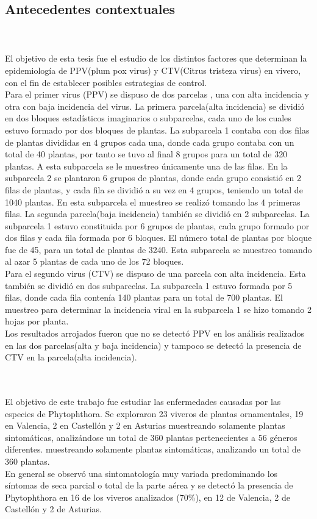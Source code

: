 \subsection{Antecedentes contextuales}
~\\\textbf{\citet{AC1}}
~\\El objetivo de esta tesis fue el estudio de los distintos factores que determinan la epidemiolog\'{i}a de PPV(plum pox virus) y CTV(Citrus tristeza virus) en vivero, con el fin de establecer posibles estrategias de control. 
~\\Para el primer virus (PPV) se dispuso de dos parcelas , una con alta incidencia y otra con baja incidencia del virus. La primera parcela(alta incidencia) se dividi\'{o} en dos bloques estad\'{i}sticos imaginarios o subparcelas, cada uno de los cuales estuvo formado por dos bloques de plantas. La subparcela 1 contaba con dos filas de plantas divididas en 4 grupos cada una, donde cada grupo contaba con un total de 40 plantas, por tanto se tuvo al final 8 grupos para un total de 320 plantas. A esta subparcela se le muestreo \'{u}nicamente una de las filas. En la subparcela 2 se plantaron 6 grupos de plantas, donde cada grupo consisti\'{o} en 2 filas de plantas, y cada fila se dividi\'{o} a su vez en 4 grupos, teniendo un total de 1040 plantas. En esta subparcela el muestreo se realiz\'{o} tomando las 4 primeras filas. La segunda parcela(baja incidencia) tambi\'{e}n se dividi\'{o} en 2 subparcelas. La subparcela 1 estuvo constituida por 6 grupos de plantas, cada grupo formado por dos filas y cada fila formada por 6 bloques. El n\'{u}mero total de plantas por bloque fue de 45, para un total de plantas de 3240. Esta subparcela se muestreo tomando al azar 5 plantas de cada uno de los 72 bloques.
~\\Para el segundo virus (CTV) se dispuso de una parcela con alta incidencia. Esta tambi\'{e}n se dividi\'{o} en dos subparcelas. La subparcela 1 estuvo formada por 5 filas, donde cada fila conten\'{i}a 140 plantas para un total de 700 plantas. El muestreo para determinar la incidencia viral en la subparcela 1 se hizo tomando 2 hojas por planta.
~\\Los resultados arrojados fueron que no se detect\'{o} PPV en los an\'{a}lisis realizados en las dos parcelas(alta y baja incidencia) y tampoco se detect\'{o} la presencia de CTV en la parcela(alta incidencia).

~\\\textbf{\citet{AC2}}
~\\El objetivo de este trabajo fue estudiar las enfermedades causadas por las especies de Phytophthora. Se exploraron 23 viveros de plantas ornamentales, 19 en Valencia, 2 en Castell\'{o}n y 2 en Asturias muestreando solamente plantas sintom\'{a}ticas, analiz\'{a}ndose un total de 360 plantas pertenecientes a 56 g\'{e}neros diferentes. muestreando solamente plantas sintom\'{a}ticas, analizando un total de 360 plantas.
~\\En general se observ\'{o} una sintomatolog\'{i}a muy variada predominando los s\'{i}ntomas de seca parcial o total de la parte a\'{e}rea y se detect\'{o} la presencia de Phytophthora en 16 de los viveros analizados (70\%), en 12 de Valencia, 2 de Castell\'{o}n y 2 de Asturias.

